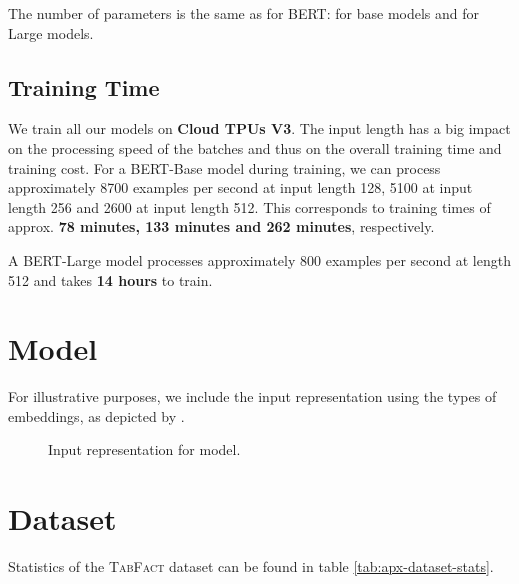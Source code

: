 \documentclass[11pt,a4paper]{article}
\newcommand{\tabfact}{\textsc{TabFact}\xspace}
\newcommand{\bert}{\textsc{BERT}\xspace}
\theoremstyle{definition}
\begin{document}
The number of parameters is the same as for \bert{}:  for base models and  for Large models.

\subsection{Training Time}
\label{sec:apx-train-time}

We train all our models on \textbf{Cloud TPUs V3}. The input length has a big impact on the processing speed of the batches and thus on the overall training time and training cost.
For a \bert{}-Base model during training, we can process approximately 8700 examples per second at input length 128, 5100 at input length 256 and 2600 at input length 512.
This corresponds to training times of approx. \textbf{78 minutes, 133 minutes and 262 minutes}, respectively.

A \bert{}-Large model  processes approximately 800 examples per second at length 512 and takes \textbf{14 hours} to train. 

\section{Model}
\label{sec:apx-input}

For illustrative purposes, we include the input representation using the  types of embeddings, as depicted by \citet{herzig-2020}.

\begin{figure}
    \centering
    \caption{Input representation for model.}
    \label{fig:apx-input}
\end{figure}

\section{Dataset}
\label{sec:apx-dataset-stats}

Statistics of the \tabfact dataset can be found in table \ref{tab:apx-dataset-stats}.

\begin{table}[H]
\begin{center}
\end{center}
\caption{\tabfact~ dataset statistics.}
\label{tab:apx-dataset-stats}
\end{table}
\end{document}
